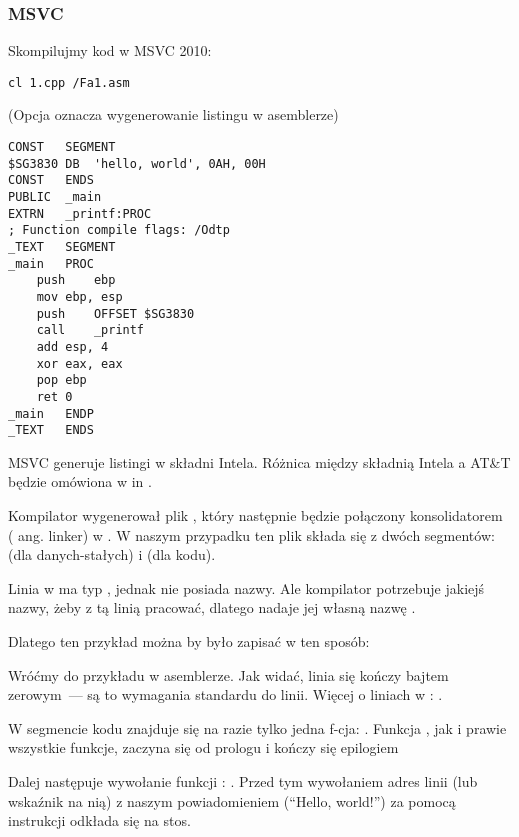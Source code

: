 \subsubsection{MSVC}

Skompilujmy kod w MSVC 2010:

\begin{lstlisting}
cl 1.cpp /Fa1.asm
\end{lstlisting}

(Opcja  oznacza wygenerowanie listingu w asemblerze)

\begin{lstlisting}[caption=MSVC 2010,style=customasmx86]
CONST	SEGMENT
$SG3830	DB	'hello, world', 0AH, 00H
CONST	ENDS
PUBLIC	_main
EXTRN	_printf:PROC
; Function compile flags: /Odtp
_TEXT	SEGMENT
_main	PROC
	push	ebp
	mov	ebp, esp
	push	OFFSET $SG3830
	call	_printf
	add	esp, 4
	xor	eax, eax
	pop	ebp
	ret	0
_main	ENDP
_TEXT	ENDS
\end{lstlisting}

MSVC generuje listingi w składni Intela.
Różnica między składnią Intela a AT\&T będzie omówiona w in .

Kompilator wygenerował plik , który następnie będzie połączony konsolidatorem ( ang. linker) w .
W naszym przypadku ten plik składa się z dwóch segmentów:  (dla danych-stałych) i  (dla kodu).

\label{string_is_const_char}
Linia  w \CCpp ma typ , jednak nie posiada nazwy.
Ale kompilator potrzebuje jakiejś nazwy, żeby z tą linią pracować, dlatego nadaje jej własną nazwę .

Dlatego ten przykład można by było zapisać w ten sposób:



Wróćmy do przykładu w asemblerze. Jak widać, linia się kończy bajtem zerowym~--- są to wymagania standardu \CCpp do linii.
Więcej o liniach w \CCpp: .

W segmencie kodu  znajduje się na razie tylko jedna f-cja: \main{}.
Funkcja \main, jak i prawie wszystkie funkcje, zaczyna się od prologu i kończy się epilogiem

Dalej następuje wywołanie funkcji \printf{}: .
Przed tym wywołaniem adres linii (lub wskaźnik na nią) z naszym powiadomieniem (``Hello, world!'') za pomocą instrukcji \PUSH odkłada się na stos.

